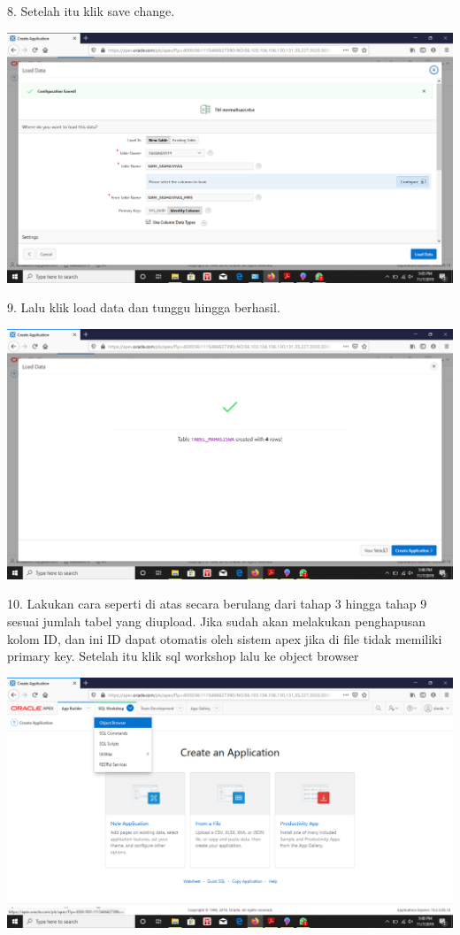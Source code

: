 \documentclass{article}
\begin{document}
\item 8. Setelah itu klik save change. 
\begin{center}
 \includegraphics[width=10cm\textwidth]{gambar/8.png}
\end{center}
\item 9. Lalu klik load data dan tunggu hingga berhasil.
\begin{center}
 \includegraphics[width=10cm\textwidth]{gambar/9.png}
\end{center}
\item 10. Lakukan cara seperti di atas secara berulang dari tahap 3 hingga tahap 9 sesuai jumlah tabel yang diupload. Jika sudah akan melakukan penghapusan kolom ID, dan ini ID dapat otomatis oleh sistem apex jika di file tidak memiliki primary key. Setelah itu klik sql workshop lalu ke object browser
\begin{center}
 \includegraphics[width=10cm\textwidth]{gambar/10.png}
\end{center}
\end{document}
